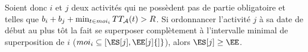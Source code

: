 \begin{reg}
\label{reg:TTDR_CUSP}
Soient donc $i$ et $j$ deux activités qui ne possèdent pas de partie
obligatoire et telles que $ b_i +b_j + \min_{t \in moi_i} TT_{{\cal A}}(t) >
R$.   Si ordonnancer l'activité
 $j$ à sa date de début au plus tôt la fait se superposer complètement
 à l’intervalle minimal de superposition de $i$ ($moi_i \subseteq
 [\ES[j],\EE[j]{]}$), alors $\ES[j] \ge \EE$.
\end{reg}

\begin{ex}

\end{ex}




